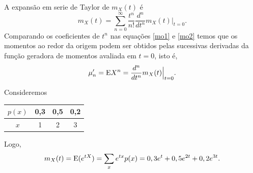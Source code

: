 \begin{frame}
	A expansão em serie de Taylor de $m_{X}(t)$ é 
	\begin{equation}
	\label{mo2}
	m_{X}(t)=\sum_{n=0}^{\infty }\frac{t^{n}}{n!}\frac{d^{n}}{dt^{n}}%
	m_{X}(t)\Bigg\vert _{t=0}.
	\end{equation} 
	Comparando os coeficientes de $t^{n}$ nas equações \eqref{mo1} e \eqref{mo2} temos 
	que os momentos ao redor da origem podem ser obtidos pelas sucessivas derivadas da função geradora de momentos avaliada em $t=0$, isto é,  
	\begin{equation*}
	\mu_n' = {\rm E}{X^{n}}=\frac{d^{n}}{dt^{n}}m_{X}(t)\Big\vert_{t=0}.
	\end{equation*}
	
	\begin{exem}
		Consideremos 
		\begin{center}
			\begin{tabular}{|c|c|c|c|} \hline
				$p(x)$ & 0,3 & 0,5 & 0,2  \\ \hline
				$x$ & 1 & 2 & 3 \\ \hline
			\end{tabular}
		\end{center}
		Logo,  
		$$
		m_{X}(t)={\rm E}(e^{tX})= \sum_x e^{tx} p(x) =0,3e^t+0,5e^{2t}+0,2e^{3t}.
		$$
	\end{exem}
\end{frame}

